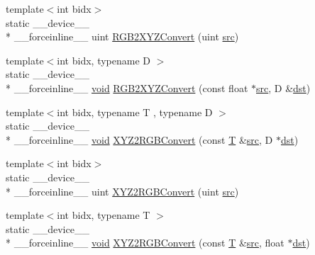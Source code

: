 \begin{DoxyCompactItemize}
{\footnotesize template$<$int bidx$>$ }\\static \-\_\-\-\_\-device\-\_\-\-\_\- \\*
\-\_\-\-\_\-forceinline\-\_\-\-\_\- uint \hyperlink{namespacecv_1_1gpu_1_1device_1_1color__detail_a8d2a88e52b4ea0382ba66f7bcdf252c2}{R\-G\-B2\-X\-Y\-Z\-Convert} (uint \hyperlink{legacy_8hpp_a371cd109b74033bc4366f584edd3dacc}{src})
\item 
{\footnotesize template$<$int bidx, typename D $>$ }\\static \-\_\-\-\_\-device\-\_\-\-\_\- \\*
\-\_\-\-\_\-forceinline\-\_\-\-\_\- \hyperlink{legacy_8hpp_a8bb47f092d473522721002c86c13b94e}{void} \hyperlink{namespacecv_1_1gpu_1_1device_1_1color__detail_ab54c78addeb3fb5a197cfcb2c267acef}{R\-G\-B2\-X\-Y\-Z\-Convert} (const float $\ast$\hyperlink{legacy_8hpp_a371cd109b74033bc4366f584edd3dacc}{src}, D \&\hyperlink{photo__c_8h_aed13e2a25279b24dc954073233fef7a5}{dst})
\item 
{\footnotesize template$<$int bidx, typename T , typename D $>$ }\\static \-\_\-\-\_\-device\-\_\-\-\_\- \\*
\-\_\-\-\_\-forceinline\-\_\-\-\_\- \hyperlink{legacy_8hpp_a8bb47f092d473522721002c86c13b94e}{void} \hyperlink{namespacecv_1_1gpu_1_1device_1_1color__detail_a59cce7c20ed52ac12ba1132de6bcbb60}{X\-Y\-Z2\-R\-G\-B\-Convert} (const \hyperlink{calib3d_8hpp_a3efb9551a871ddd0463079a808916717}{T} \&\hyperlink{legacy_8hpp_a371cd109b74033bc4366f584edd3dacc}{src}, D $\ast$\hyperlink{photo__c_8h_aed13e2a25279b24dc954073233fef7a5}{dst})
\item 
{\footnotesize template$<$int bidx$>$ }\\static \-\_\-\-\_\-device\-\_\-\-\_\- \\*
\-\_\-\-\_\-forceinline\-\_\-\-\_\- uint \hyperlink{namespacecv_1_1gpu_1_1device_1_1color__detail_af1803d24d2e68958e2d0b860cc9c1db5}{X\-Y\-Z2\-R\-G\-B\-Convert} (uint \hyperlink{legacy_8hpp_a371cd109b74033bc4366f584edd3dacc}{src})
\item 
{\footnotesize template$<$int bidx, typename T $>$ }\\static \-\_\-\-\_\-device\-\_\-\-\_\- \\*
\-\_\-\-\_\-forceinline\-\_\-\-\_\- \hyperlink{legacy_8hpp_a8bb47f092d473522721002c86c13b94e}{void} \hyperlink{namespacecv_1_1gpu_1_1device_1_1color__detail_af9cdc4e05508f34c35fd9930d788ecea}{X\-Y\-Z2\-R\-G\-B\-Convert} (const \hyperlink{calib3d_8hpp_a3efb9551a871ddd0463079a808916717}{T} \&\hyperlink{legacy_8hpp_a371cd109b74033bc4366f584edd3dacc}{src}, float $\ast$\hyperlink{photo__c_8h_aed13e2a25279b24dc954073233fef7a5}{dst})

\end{DoxyCompactItemize}

